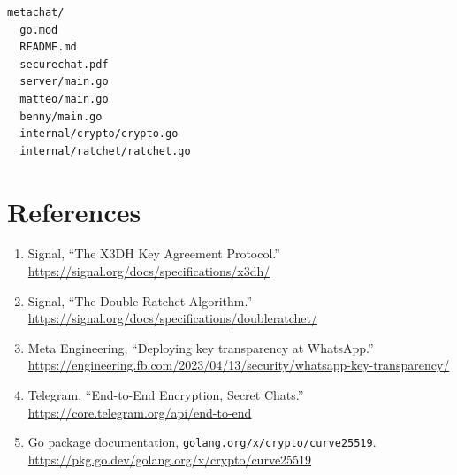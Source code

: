 \documentclass[12pt,a4paper]{article}
\begin{document}
\begin{lstlisting}[style=output]
metachat/
  go.mod
  README.md
  securechat.pdf
  server/main.go
  matteo/main.go
  benny/main.go
  internal/crypto/crypto.go
  internal/ratchet/ratchet.go
\end{lstlisting}

\section{References}

\begin{enumerate}
    \item Signal, ``The X3DH Key Agreement Protocol.'' \url{https://signal.org/docs/specifications/x3dh/}
    \item Signal, ``The Double Ratchet Algorithm.'' \url{https://signal.org/docs/specifications/doubleratchet/}
    \item Meta Engineering, ``Deploying key transparency at WhatsApp.'' \url{https://engineering.fb.com/2023/04/13/security/whatsapp-key-transparency/}
    \item Telegram, ``End-to-End Encryption, Secret Chats.'' \url{https://core.telegram.org/api/end-to-end}
    \item Go package documentation, \texttt{golang.org/x/crypto/curve25519}. \url{https://pkg.go.dev/golang.org/x/crypto/curve25519}
\end{enumerate}
\end{document}
